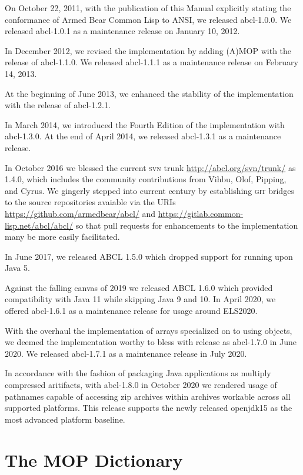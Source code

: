 \documentclass[10pt]{book}
\begin{document}
On October 22, 2011, with the publication of this Manual explicitly
stating the conformance of Armed Bear Common Lisp to \textsc{ANSI}, we
released abcl-1.0.0.  We released abcl-1.0.1 as a maintenance release
on January 10, 2012.

In December 2012, we revised the implementation by adding
\textsc{(A)MOP} with the release of abcl-1.1.0.  We released
abcl-1.1.1 as a maintenance release on February 14, 2013.

At the beginning of June 2013, we enhanced the stability of the
implementation with the release of abcl-1.2.1.

In March 2014, we introduced the Fourth Edition of the implementation
with abcl-1.3.0.  At the end of April 2014, we released abcl-1.3.1 as
a maintenance release.

In October 2016 we blessed the current \textsc{svn} trunk
\url{http://abcl.org/svn/trunk/} as 1.4.0, which includes the
community contributions from Vihbu, Olof, Pipping, and Cyrus.  We
gingerly stepped into current century by establishing \textsc{git}
bridges to the source repositories avaiable via the URIs
\url{https://github.com/armedbear/abcl/} and
\url{https://gitlab.common-lisp.net/abcl/abcl/} so that pull requests
for enhancements to the implementation many be more easily
facilitated.

In June 2017, we released ABCL 1.5.0 which dropped support for running
upon Java 5.

Against the falling canvas of 2019 we released ABCL 1.6.0 which
provided compatibility with Java 11 while skipping Java 9 and 10.  In
April 2020, we offered abcl-1.6.1 as a maintenance release for usage
around ELS2020.

With the overhaul the implementation of arrays specialized on
 to
using  objects, we deemed the implementation
worthy to bless with release as abcl-1.7.0 in June 2020.  We released
abcl-1.7.1 as a maintenance release in July 2020.

In accordance with the fashion of packaging Java applications as
multiply compressed aritifacts, with abcl-1.8.0 in October 2020 we
rendered usage of pathnames capable of accessing zip archives within
archives workable across all supported platforms.  This release
supports the newly released openjdk15 as the most advanced platform
baseline.  

\appendix 

\chapter{The MOP Dictionary}
\end{document}

